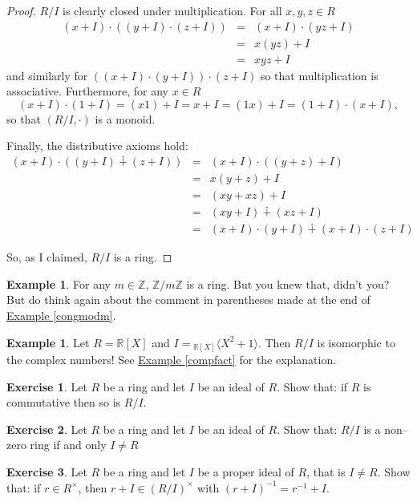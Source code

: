 \documentclass[11pt]{amsbook}
\theoremstyle{definition}
\newtheorem{ex}[theorem]{Example}
\newtheorem{exercise}{Exercise}
\begin{document}
\begin{proof}
$R/I$ is clearly closed under multiplication. For all $x,y,z\in R$ \begin{eqnarray*} (x+I)\cdot \left((y+I)\cdot (z+I)\right) &=& (x+I)\cdot (yz+I) \\ & = & x(yz) +I \\ & =& xyz + I \end{eqnarray*} and similarly for $\left((x+I)\cdot (y+I)\right) \cdot (z+I)$ so that multiplication is associative. Furthermore, for any $x\in R$ $$(x+I)\cdot (1 + I) = (x1) + I = x + I = (1x) + I =  (1+I)\cdot (x+I),$$ so that $(R/I, \cdot)$ is a monoid.

Finally, the distributive axioms hold: \begin{eqnarray*} (x+I)\cdot \left( (y+I) \dotplus (z+I) \right) &=& (x+I)\cdot( (y+z)+I ) \\ &=& x(y+z) + I \\ &=& (xy + xz) + I \\ &=& (xy+I)\dotplus (xz+I) \\ &=& (x+I)\cdot (y+I) \dotplus (x+I)\cdot (z+I)\end{eqnarray*}

So, as I claimed, $R/I$ is a ring.
\end{proof}

\begin{ex}  For any $m\in \mathbb{Z}$, $\mathbb{Z} /m\mathbb{Z}$ is a ring. But you knew that, didn't you? But do think again about the comment in parentheses made at the end of \hyperref[congmodm]{Example \ref{congmodm}}. \end{ex}

\begin{ex} \label{compasquot} Let $R = \mathbb{R}[X]$ and $I = {}_{\mathbb{R}[X]}\langle X^2+1 \rangle$. Then $R/I$ is isomorphic to the complex numbers! See \hyperref[compfact]{Example \ref{compfact}} for the explanation.
\end{ex}

\begin{exercise}
Let $R$ be a ring and let $I$ be an ideal of $R$. Show that: if $R$ is commutative then so is $R/I$.
\end{exercise}
\begin{exercise}
Let $R$ be a ring and let $I$ be an ideal of $R$. Show that: $R/I$ is a non--zero ring if and only $I \neq R$
\end{exercise}
\begin{exercise}
Let $R$ be a ring and let $I$ be a proper ideal of $R$, that is $I\neq R$. Show that: if $r \in R^{\times}$, then $r+I \in (R/I)^{\times}$ with $(r+I)^{-1} = r^{-1} + I$.
\end{exercise}
\end{document}
